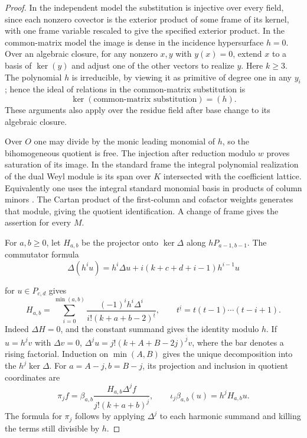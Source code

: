 \begin{proof}
In the independent model the substitution is injective over
every field, since each nonzero covector is the exterior
product of some frame of its kernel, with one frame variable
rescaled to give the specified exterior product. In the
common-matrix model the image is dense in the incidence
hypersurface \(h=0\). Over an algebraic closure, for any
nonzero \(x,y\) with \(y(x)=0\), extend \(x\) to a basis of
\(\ker(y)\) and adjust one of the other vectors to realize
\(y\). Here \(k\ge3\). The polynomial \(h\) is irreducible, by
viewing it as primitive of degree one in any \(y_i\); hence the ideal of relations in the common-matrix substitution is
\[
 \ker(\text{common-matrix substitution})=(h).
\]
These arguments also apply over the residue
field after base change to its algebraic closure.

Over \(O\)
one may divide by the monic leading monomial of \(h\), so the
bihomogeneous quotient is free. The injection after reduction
modulo \(w\) proves saturation of its image. In the standard
frame the integral polynomial realization of the dual Weyl
module is its span over \(K\) intersected with the coefficient
lattice. Equivalently one uses the integral standard monomial
basis in products of column minors \cite[Theorem II.2.16]{abw-schur}.
The Cartan product of the
first-column and cofactor weights generates that module, giving
the quotient identification. A change of frame gives the assertion for every \(M\).

For \(a,b\ge0\), let \(H_{a,b}\) be the projector onto
\(\ker\Delta\) along \(hP_{a-1,b-1}\).
The commutator formula
\[
 \Delta(h^i u)=h^i\Delta u+i(k+c+d+i-1)h^{i-1}u
\]

for \(u\in P_{c,d}\) gives
\[
 H_{a,b}=\sum_{i=0}^{\min(a,b)}
    \frac{(-1)^i h^i\Delta^i}{i!(k+a+b-2)^{\underline i}},
 \qquad t^{\underline i}=t(t-1)\cdots(t-i+1).
\]
Indeed \(\Delta H=0\), and the constant summand gives the
identity modulo \(h\). If \(u=h^j v\) with \(\Delta v=0\),
\(\Delta^j u=j!(k+A+B-2j)^{\overline j}v\), where the bar
denotes a rising factorial. Induction on \(\min(A,B)\) gives
the unique decomposition into the \(h^j\ker\Delta\).
For \(a=A-j,b=B-j\), its projection and inclusion in
quotient coordinates are
\[
 \pi_j f=\beta_{a,b}\frac{H_{a,b}\Delta^j f}
                        {j!(k+a+b)^{\overline j}},
 \qquad
 \iota_j\beta_{a,b}(u)=h^jH_{a,b}u.
\]
The formula for \(\pi_j\) follows by applying \(\Delta^j\)
to each harmonic summand and killing the terms still divisible
by \(h\).


\end{proof}
